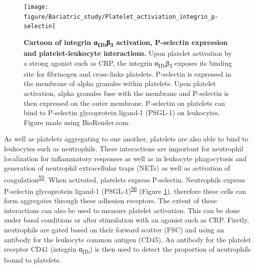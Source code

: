 \documentclass[11pt,twoside]{bristolthesis}
\begin{document}
\begin{figure}
\texttt{[image: figure/Bariatric\_study/Platelet\_activiation\_integrin\_p-selectin]} \caption[Cartoon of integrin α\textsubscript{IIb}β\textsubscript{3} activation, P-selectin expression and platelet-leukocyte interactions]{\textbf{Cartoon of integrin α\textsubscript{IIb}β\textsubscript{3} activation, P-selectin expression and platelet-leukocyte interactions.} Upon platelet activation by a strong agonist such as CRP, the integrin α\textsubscript{IIb}β\textsubscript{3} exposes its binding site for fibrinogen and cross-links platelets. P-selectin is expressed in the membrane of alpha granules within platelets. Upon platelet activation, alpha granules fuse with the membrane and P-selectin is then expressed on the outer membrane. P-selectin on platelets can bind to P-selectin glycoprotein ligand-1 (PSGL-1) on leukocytes. Figure made using BioRender.com.}\label{fig:platelet-activation-background}
\end{figure}
As well as platelets aggregating to one another, platelets are also able to bind to leukocytes such as neutrophils. These interactions are important for neutrophil localization for inflammatory responses as well as in leukocyte phagocytosis and generation of neutrophil extracellular traps (NETs) as well as activation of coagulation\textsuperscript{\protect\hyperlink{ref-Lisman2018}{55}}. When activated, platelets express P-selectin. Neutrophils express P-selectin glycoprotein ligand-1 (PSGL-1)\textsuperscript{\protect\hyperlink{ref-Zarbock2007}{56}} (Figure \ref{fig:platelet-activation-background}), therefore these cells can form aggregates through these adhesion receptors. The extent of these interactions can also be used to measure platelet activation. This can be done under basal conditions or after stimulation with an agonist such as CRP. Firstly, neutrophils are gated based on their forward scatter (FSC) and using an antibody for the leukocyte common antigen (CD45). An antibody for the platelet receptor CD41 (integrin α\textsubscript{IIb}) is then used to detect the proportion of neutrophils bound to platelets.
\end{document}
